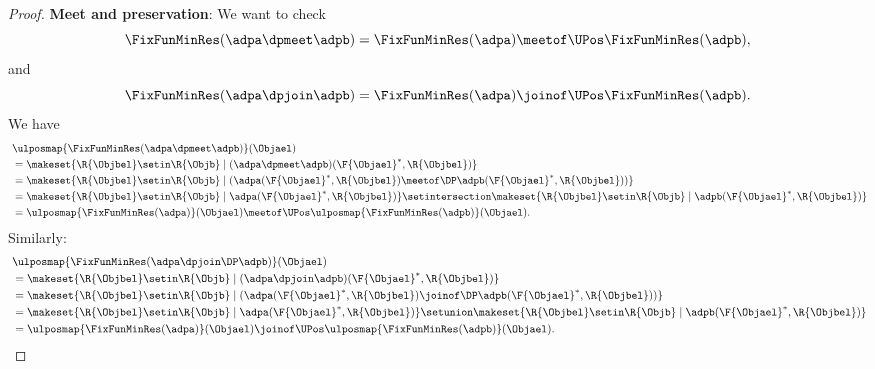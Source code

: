 \begin{proof}
    \textbf{Meet and  preservation}:
    We want to check
    \begin{equation}
        \FixFunMinRes(\adpa \dpmeet \adpb)=\FixFunMinRes(\adpa) \meetof\UPos \FixFunMinRes(\adpb),
    \end{equation}
    and
    \begin{equation}
        \FixFunMinRes(\adpa \dpjoin \adpb)=\FixFunMinRes(\adpa) \joinof\UPos \FixFunMinRes(\adpb).
    \end{equation}
    We have
    \begin{equation}
        \begin{aligned}
            ~ &
            \ulposmap{\FixFunMinRes(\adpa \dpmeet \adpb)}(\Objael) \\
              & =\makeset{ \R{\Objbel} \setin \R{\Objb} \mid (\adpa \dpmeet \adpb)(\F{\Objael}^*,\R{\Objbel})} \\
              & =\makeset{ \R{\Objbel} \setin \R{\Objb} \mid (\adpa(\F{\Objael}^*,\R{\Objbel})\meetof\DP \adpb(\F{\Objael}^*,\R{\Objbel}))} \\
              & =\makeset{ \R{\Objbel} \setin \R{\Objb} \mid \adpa(\F{\Objael}^*,\R{\Objbel})} \setintersection \makeset{ \R{\Objbel} \setin \R{\Objb} \mid \adpb(\F{\Objael}^*,\R{\Objbel})} \\
              & =\ulposmap{\FixFunMinRes(\adpa)}(\Objael) \meetof\UPos \ulposmap{\FixFunMinRes(\adpb)}(\Objael).
        \end{aligned}
    \end{equation}
    Similarly:
    \begin{equation}
        \begin{aligned}
            ~ & \ulposmap{\FixFunMinRes(\adpa \dpjoin\DP \adpb)}(\Objael) \\
              & =\makeset{ \R{\Objbel} \setin \R{\Objb} \mid (\adpa \dpjoin \adpb)(\F{\Objael}^*,\R{\Objbel})} \\
              & =\makeset{ \R{\Objbel} \setin \R{\Objb} \mid (\adpa(\F{\Objael}^*,\R{\Objbel})\joinof\DP \adpb(\F{\Objael}^*,\R{\Objbel}))} \\
              & =\makeset{ \R{\Objbel} \setin \R{\Objb} \mid \adpa(\F{\Objael}^*,\R{\Objbel})} \setunion \makeset{ \R{\Objbel} \setin \R{\Objb} \mid \adpb(\F{\Objael}^*,\R{\Objbel})} \\
              & =\ulposmap{\FixFunMinRes(\adpa)}(\Objael) \joinof\UPos \ulposmap{\FixFunMinRes(\adpb)}(\Objael).
        \end{aligned}
    \end{equation}


\end{proof}
